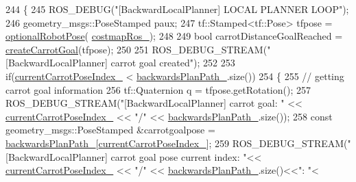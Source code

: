 \begin{DoxyCode}
244         \{
245             ROS\_DEBUG(\textcolor{stringliteral}{"[BackwardLocalPlanner] LOCAL PLANNER LOOP"});
246             geometry\_msgs::PoseStamped paux;
247             tf::Stamped<tf::Pose> tfpose = \hyperlink{namespacecl__move__base__z_1_1backward__local__planner_afd5bb2a0d144f7b89f4215fbcb1fbe69}{optionalRobotPose}(
      \hyperlink{classcl__move__base__z_1_1backward__local__planner_1_1BackwardLocalPlanner_a4136268882a105d9e06e173d85d5c0dc}{costmapRos\_});
248 
249             \textcolor{keywordtype}{bool} carrotDistanceGoalReached = \hyperlink{classcl__move__base__z_1_1backward__local__planner_1_1BackwardLocalPlanner_a786337a838e58b38b724bc342cf76e10}{createCarrotGoal}(tfpose);
250 
251             ROS\_DEBUG\_STREAM(\textcolor{stringliteral}{"[BackwardLocalPlanner] carrot goal created"});
252 
253             \textcolor{keywordflow}{if}(\hyperlink{classcl__move__base__z_1_1backward__local__planner_1_1BackwardLocalPlanner_a2e8f2b78bc97f27c5fa431f3af2261ed}{currentCarrotPoseIndex\_} < 
      \hyperlink{classcl__move__base__z_1_1backward__local__planner_1_1BackwardLocalPlanner_ad9cde5c85f782cab2ddb4030e3c3f2cf}{backwardsPlanPath\_}.size())
254             \{
255                 \textcolor{comment}{// getting carrot goal information}
256                 tf::Quaternion q = tfpose.getRotation();
257                 ROS\_DEBUG\_STREAM(\textcolor{stringliteral}{"[BackwardLocalPlanner] carrot goal: "} << 
      \hyperlink{classcl__move__base__z_1_1backward__local__planner_1_1BackwardLocalPlanner_a2e8f2b78bc97f27c5fa431f3af2261ed}{currentCarrotPoseIndex\_} << \textcolor{stringliteral}{"/"}  << \hyperlink{classcl__move__base__z_1_1backward__local__planner_1_1BackwardLocalPlanner_ad9cde5c85f782cab2ddb4030e3c3f2cf}{backwardsPlanPath\_}.size());
258                 \textcolor{keyword}{const} geometry\_msgs::PoseStamped &carrotgoalpose = 
      \hyperlink{classcl__move__base__z_1_1backward__local__planner_1_1BackwardLocalPlanner_ad9cde5c85f782cab2ddb4030e3c3f2cf}{backwardsPlanPath\_}[\hyperlink{classcl__move__base__z_1_1backward__local__planner_1_1BackwardLocalPlanner_a2e8f2b78bc97f27c5fa431f3af2261ed}{currentCarrotPoseIndex\_}];
259                 ROS\_DEBUG\_STREAM(\textcolor{stringliteral}{"[BackwardLocalPlanner] carrot goal pose current index: "}<< 
      \hyperlink{classcl__move__base__z_1_1backward__local__planner_1_1BackwardLocalPlanner_a2e8f2b78bc97f27c5fa431f3af2261ed}{currentCarrotPoseIndex\_} << \textcolor{stringliteral}{"/"} << \hyperlink{classcl__move__base__z_1_1backward__local__planner_1_1BackwardLocalPlanner_ad9cde5c85f782cab2ddb4030e3c3f2cf}{backwardsPlanPath\_}.size()<<\textcolor{stringliteral}{": "}<

\end{DoxyCode}
